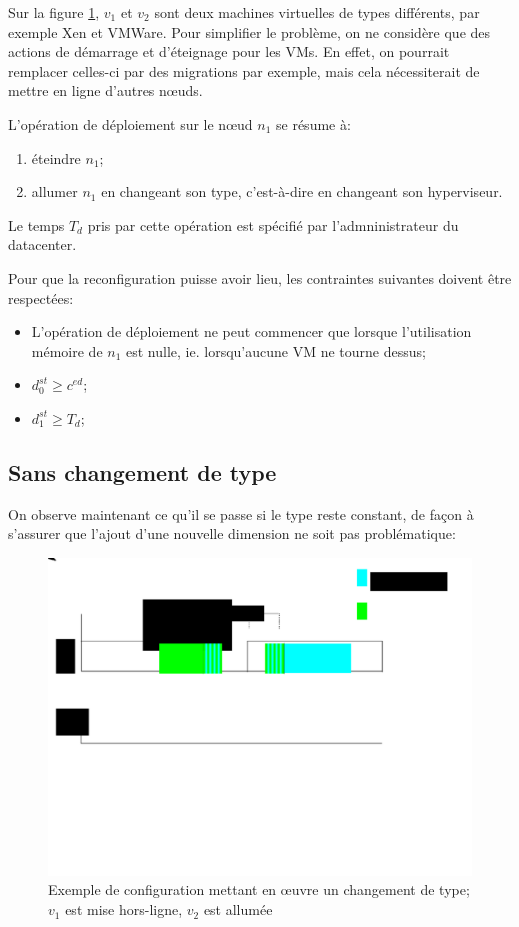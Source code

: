 \documentclass[a4paper]{article}
\begin{document}
Sur la figure \ref{config}, $v_1$ et $v_2$ sont deux machines
virtuelles de types différents, par exemple Xen et VMWare.
Pour simplifier le problème, on ne considère que des actions
de démarrage et d'éteignage pour les VMs. En effet, on pourrait
remplacer celles-ci par des migrations par exemple, mais cela
nécessiterait de mettre en ligne d'autres nœuds.

L'opération de déploiement sur le nœud $n_1$ se résume à:
\begin{enumerate}
	\item éteindre $n_1$;
	\item allumer $n_1$ en changeant son type, c'est-à-dire en changeant
		son hyperviseur.
\end{enumerate}
Le temps $T_d$ pris par cette opération est spécifié par l'admninistrateur
du datacenter.

Pour que la reconfiguration puisse avoir lieu, les contraintes suivantes
doivent être respectées:
\begin{itemize}
	\item L'opération de déploiement ne peut commencer que lorsque
		l'utilisation mémoire de $n_1$ est nulle, ie. lorsqu'aucune VM
		ne tourne dessus;
	\item $d_0^{st} \geq c^{ed}$;
	\item $d_1^{st} \geq T_d$;
\end{itemize}

\subsection{Sans changement de type}
On observe maintenant ce qu'il se passe si le type reste constant, de
façon à s'assurer que l'ajout d'une nouvelle dimension ne soit pas
problématique:
\begin{figure}[!ht]
	\centering
	\includegraphics[scale=.45]{imgs/config2.eps}
	\caption{\label{config} Exemple de configuration mettant en œuvre un
		changement de type; $v_1$ est mise hors-ligne, $v_2$ est allumée}
\end{figure}
\end{document}
